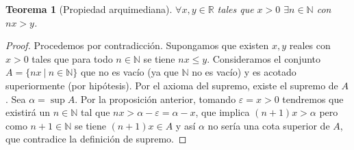 \documentclass{article}
\newtheorem{theorem}{Teorema}
\newcommand{\naturales}{\mathbb{N}}
\begin{document}
\begin{theorem}[Propiedad arquimediana]
$\forall x,y \in \mathbb{R}$ tales que $x>0$ $\exists n \in \mathbb{N}$ con $nx>y$.
\end{theorem}
\begin{proof}
	Procedemos por contradicción. Supongamos que existen $x,y$ reales con $x > 0$ tales que para todo $n \in \naturales$ se tiene $nx \leq y$. Consideramos el conjunto $A = \{nx\ |\ n \in \naturales \}$ que no es vacío (ya que $\naturales$ no es vacío) y es acotado superiormente (por hipótesis). Por el axioma del supremo, existe el supremo de $A$. Sea $\alpha = \sup A$. Por la proposición anterior, tomando $\varepsilon = x > 0$ tendremos que existirá un $n \in \naturales$ tal que $nx > \alpha - \varepsilon = \alpha - x$, que implica $(n+1)x > \alpha$ pero como $n+1 \in \naturales$ se tiene $(n+1)x \in A$ y así $\alpha$ no sería una cota superior de $A$, que contradice la definición de supremo.
\end{proof}
\end{document}
